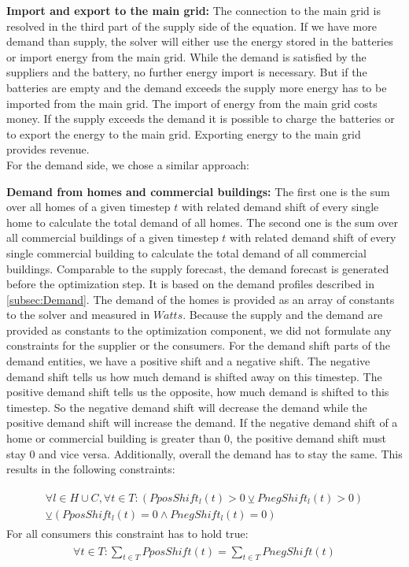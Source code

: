 \textbf{Import and export to the main grid:} The connection to the main grid is resolved in the third part of the supply side of the equation.
If we have more demand than supply, the solver will either use the energy stored in the batteries or import energy from the main grid. While the demand is satisfied by the suppliers and the battery, no further energy import is necessary. But if the batteries are empty and the demand exceeds the supply more energy has to be imported from the main grid. The import of energy from the main grid costs money. If the supply exceeds the demand it is possible to charge the batteries or to export the energy to the main grid. Exporting energy to the main grid provides revenue.
\\\newline
For the demand side, we chose a similar approach:

\textbf{Demand from homes and commercial buildings:} The first one is the sum over all homes of a given timestep $t$ with related demand shift of every single home to calculate the total demand of all homes.
The second one is the sum over all commercial buildings of a given timestep $t$ with related demand shift of every single commercial building to calculate the total demand of all commercial buildings.
Comparable to the supply forecast, the demand forecast is generated before the optimization step. 
It is based on the demand profiles described in \cref{subsec:Demand}. 
The demand of the homes is provided as an array of constants to the solver and measured in $Watts$. 
Because the supply and the demand are provided as constants to the optimization component, we did not formulate any constraints for the supplier or the consumers.
For the demand shift parts of the demand entities, we have a positive shift and a negative shift.
The negative demand shift tells us how much demand is shifted away on this timestep.
The positive demand shift tells us the opposite, how much demand is shifted to this timestep.
So the negative demand shift will decrease the demand while the positive demand shift will increase the demand.
If the negative demand shift of a home or commercial building is greater than 0, the positive demand shift must stay 0 and vice versa. Additionally, overall the demand has to stay the same. 
This results in the following constraints:

\begin{align} \label{eq:shift}
\begin{split}
\forall l \in H\cup C, \forall t \in T: (PposShift_{l}(t) > 0 \veebar PnegShift_{l}(t) > 0)\\ \veebar (PposShift_{l}(t) = 0 \wedge PnegShift_{l}(t) = 0)
\end{split}
\end{align}
For all consumers this constraint has to hold true:
\begin{align} \label{eq:shiftSum}
\begin{split}
\forall t \in T: \sum\limits_{t\in T} PposShift(t) = \sum\limits_{t\in T} PnegShift(t)\\
\end{split}
\end{align}

